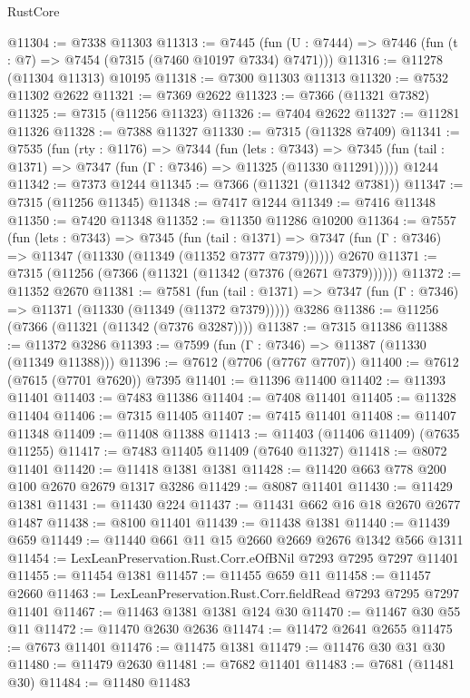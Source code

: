 \begin{lexlean}{RustCore}
\begin{coremodule}
@11304 := @7338 @11303
@11313 := @7445
    (fun (U : @7444) => @7446 (fun (t : @7) => @7454 (@7315 (@7460 @10197 @7334) @7471)))
@11316 := @11278 (@11304 @11313) @10195
@11318 := @7300 @11303 @11313
@11320 := @7532 @11302 @2622
@11321 := @7369 @2622
@11323 := @7366 (@11321 @7382)
@11325 := @7315 (@11256 @11323)
@11326 := @7404 @2622
@11327 := @11281 @11326
@11328 := @7388 @11327
@11330 := @7315 (@11328 @7409)
@11341 := @7535
    (fun (rty : @1176) =>
    @7344
      (fun (lets : @7343) =>
      @7345 (fun (tail : @1371) => @7347 (fun (Γ : @7346) => @11325 (@11330 @11291)))))
    @1244
@11342 := @7373 @1244
@11345 := @7366 (@11321 (@11342 @7381))
@11347 := @7315 (@11256 @11345)
@11348 := @7417 @1244
@11349 := @7416 @11348
@11350 := @7420 @11348
@11352 := @11350 @11286 @10200
@11364 := @7557
    (fun (lets : @7343) =>
    @7345
      (fun (tail : @1371) =>
      @7347 (fun (Γ : @7346) => @11347 (@11330 (@11349 (@11352 @7377 @7379))))))
    @2670
@11371 := @7315 (@11256 (@7366 (@11321 (@11342 (@7376 (@2671 @7379))))))
@11372 := @11352 @2670
@11381 := @7581
    (fun (tail : @1371) => @7347 (fun (Γ : @7346) => @11371 (@11330 (@11349 (@11372 @7379)))))
    @3286
@11386 := @11256 (@7366 (@11321 (@11342 (@7376 @3287))))
@11387 := @7315 @11386
@11388 := @11372 @3286
@11393 := @7599 (fun (Γ : @7346) => @11387 (@11330 (@11349 @11388)))
@11396 := @7612 (@7706 (@7767 @7707))
@11400 := @7612 (@7615 (@7701 @7620)) @7395
@11401 := @11396 @11400
@11402 := @11393 @11401
@11403 := @7483 @11386
@11404 := @7408 @11401
@11405 := @11328 @11404
@11406 := @7315 @11405
@11407 := @7415 @11401
@11408 := @11407 @11348
@11409 := @11408 @11388
@11413 := @11403 (@11406 @11409) (@7635 @11255)
@11417 := @7483 @11405 @11409 (@7640 @11327)
@11418 := @8072 @11401
@11420 := @11418 @1381 @1381
@11428 := @11420 @663 @778 @200 @100 @2670 @2679 @1317 @3286
@11429 := @8087 @11401
@11430 := @11429 @1381
@11431 := @11430 @224
@11437 := @11431 @662 @16 @18 @2670 @2677 @1487
@11438 := @8100 @11401
@11439 := @11438 @1381
@11440 := @11439 @659
@11449 := @11440 @661 @11 @15 @2660 @2669 @2676 @1342 @566 @1311
@11454 := LexLeanPreservation.Rust.Corr.eOfBNil @7293 @7295 @7297 @11401
@11455 := @11454 @1381
@11457 := @11455 @659 @11
@11458 := @11457 @2660
@11463 := LexLeanPreservation.Rust.Corr.fieldRead @7293 @7295 @7297 @11401
@11467 := @11463 @1381 @1381 @124 @30
@11470 := @11467 @30 @55 @11
@11472 := @11470 @2630 @2636
@11474 := @11472 @2641 @2655
@11475 := @7673 @11401
@11476 := @11475 @1381
@11479 := @11476 @30 @31 @30
@11480 := @11479 @2630
@11481 := @7682 @11401
@11483 := @7681 (@11481 @30)
@11484 := @11480 @11483

\end{coremodule}
\end{lexlean}
